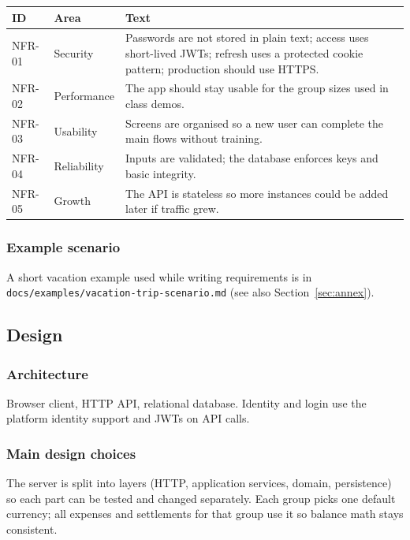 \documentclass[11pt,a4paper]{article}
\begin{document}
\begin{center}
\small
\begin{tabular}{@{}p{}p{}p{}@{}}
\toprule
\textbf{ID} & \textbf{Area} & \textbf{Text} \\
\midrule
NFR-01 & Security & Passwords are not stored in plain text; access uses short-lived JWTs; refresh uses a protected cookie pattern; production should use HTTPS. \\
NFR-02 & Performance & The app should stay usable for the group sizes used in class demos. \\
NFR-03 & Usability & Screens are organised so a new user can complete the main flows without training. \\
NFR-04 & Reliability & Inputs are validated; the database enforces keys and basic integrity. \\
NFR-05 & Growth & The API is stateless so more instances could be added later if traffic grew. \\
\bottomrule
\end{tabular}
\end{center}

\subsubsection{Example scenario}

A short vacation example used while writing requirements is in \texttt{docs/examples/vacation-trip-scenario.md} (see also Section~\ref{sec:annex}).

\subsection{Design}

\subsubsection{Architecture}

Browser client, HTTP API, relational database. Identity and login use the platform identity support and JWTs on API calls.

\subsubsection{Main design choices}

The server is split into layers (HTTP, application services, domain, persistence) so each part can be tested and changed separately. Each group picks one default currency; all expenses and settlements for that group use it so balance math stays consistent.
\end{document}
